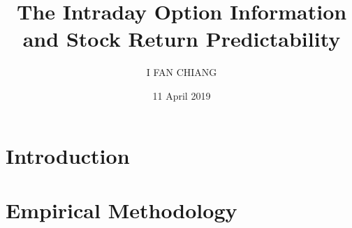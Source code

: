 \documentclass[oneside,11pt]{article}
\title{\textbf{The Intraday Option Information and Stock Return Predictability}}
\author{I FAN CHIANG}
\date{11 April 2019}
\begin{document}
\maketitle

\begin{abstract}
\centering

\end{abstract}


\section{Introduction}




\section{Empirical Methodology}




\newpage
\printbibliography
\end{document}
